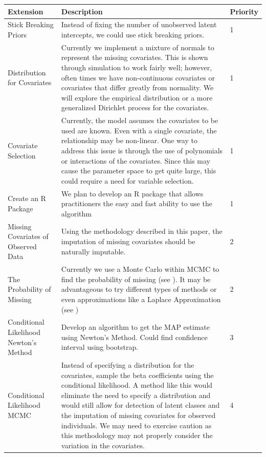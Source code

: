 \documentclass[
  12pt,
]{article}
\begin{document}
\begin{table}[H]
\centering
\begin{tabular}{||p{3cm}||p{10cm}|p{1.2cm}||} 
 \hline
 Extension & Description & Priority    \\ [0.5ex] 
 \hline\hline
  Stick Breaking Priors & Instead of fixing the number of unobserved latent intercepts, we could use stick breaking priors. &  1   \\ 
 \hline
 Distribution for Covariates & Currently we implement a mixture of normals to represent the missing covariates.  This is shown through simulation to work fairly well; however, often times we have non-continuous covariates or covariates that differ greatly from normality.  We will explore the empirical distribution or a more generalized Dirichlet process for the covariates. & 1   \\
 \hline
  Covariate Selection & Currently, the model assumes the covariates to be used are known.  Even with a single covariate, the relationship may be non-linear.  One way to address this issue is through the use of polynomials or interactions of the covariates.  Since this may cause the parameter space to get quite large, this could require a need for variable selection. & 1  \\
 \hline
 Create an R Package & We plan to develop an R package that allows practitioners the easy and fast ability to use the algorithm & 1   \\ 
 \hline
 Missing Covariates of Observed Data & Using the methodology described in this paper, the imputation of missing covariates should be naturally imputable. &  2   \\ 
 \hline
 The Probability of Missing & Currently we use a Monte Carlo within MCMC to find the probability of missing (see \cite{bonner_mcmcmc_2014}).  It may be advantageous to try different types of methods or even approximations like a Laplace Approximation (see \cite{herliansyah_laplace_2022})&  2  \\
  \hline
Conditional Likelihood Newton's Method & Develop an algorithm to get the MAP estimate using Newton's Method.  Could find confidence interval using bootstrap. & 3  \\
 \hline
Conditional Likelihood MCMC & Instead of specifying a distribution for the covariates, sample the beta coefficients using the conditional likelihood. A method like this would eliminate the need to specify a distribution and would still allow for detection of latent classes and the imputation of missing covariates for observed individuals.  We may need to exercise caution as this methodology may not properly consider the variation in the covariates. & 4   \\

\end{tabular}
\end{table}
\end{document}
